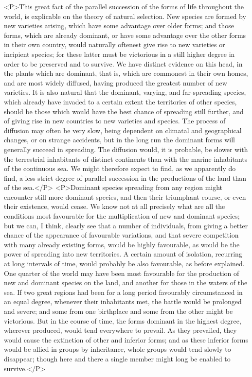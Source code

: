 <P>This great fact of the parallel succession of the forms of life throughout the world, is explicable on the theory of natural selection. New species are formed by new varieties arising, which have some advantage over older forms; and those forms, which are already dominant, or have some advantage over the other forms in their own country, would naturally oftenest give rise to new varieties or incipient species; for these latter must be victorious in a still higher degree in order to be preserved and to survive.  We have distinct evidence on this head, in the plants which are dominant, that is, which are commonest in their own homes, and are most widely diffused, having produced the greatest number of new varieties. It is also natural that the dominant, varying, and far-spreading species, which already have invaded to a certain extent the territories of other species, should be those which would have the best chance of spreading still further, and of giving rise in new countries to new varieties and species. The process of diffusion may often be very slow, being dependent on climatal and geographical changes, or on strange accidents, but in the long run the dominant forms will generally succeed in spreading. The diffusion would, it is probable, be slower with the terrestrial inhabitants of distinct continents than with the marine inhabitants of the continuous sea. We might therefore expect to find, as we apparently do find, a less strict degree of parallel succession in the productions of the land than of the sea.</P>
<P>Dominant species spreading from any region might encounter still more dominant species, and then their triumphant course, or even their existence, would cease. We know not at all precisely what are all the conditions most favourable for the multiplication of new and dominant species; but we can, I think, clearly see that a number of individuals, from giving a better chance of the appearance of favourable variations, and that severe competition with many already existing forms, would be highly favourable, as would be the power of spreading into new territories. A certain amount of isolation, recurring at long intervals of time, would probably be also favourable, as before explained. One quarter of the world may have been most favourable for the production of new and dominant species on the land, and another for those in the waters of the sea. If two great regions had been for a long period favourably circumstanced in an equal degree, whenever their inhabitants met, the battle would be prolonged and severe; and some from one birthplace and some from the other might be victorious.  But in the course of time, the forms dominant in the highest degree, wherever produced, would tend everywhere to prevail.  As they prevailed, they would cause the extinction of other and inferior forms; and as these inferior forms would be allied in groups by inheritance, whole groups would tend slowly to disappear; though here and there a single member might long be enabled to survive.</P>
